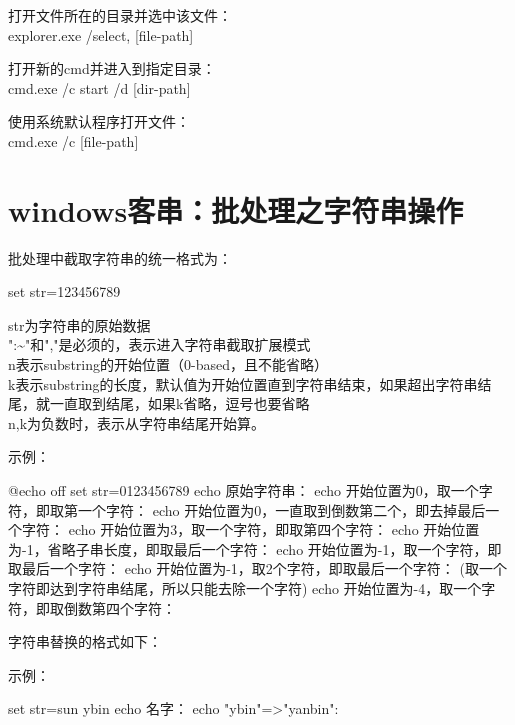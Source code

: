 ﻿\documentclass[a4paper,11pt]{article}
\begin{document}
  打开文件所在的目录并选中该文件：\\
  explorer.exe /select, [file-path]

  打开新的cmd并进入到指定目录：\\
  cmd.exe /c start /d [dir-path]

  使用系统默认程序打开文件：\\
  cmd.exe /c [file-path]

  \section[Windows客串：批处理-字符串操作]{windows客串：批处理之字符串操作}
  批处理中截取字符串的统一格式为：

  \begin{bashcode}
    set str=123456789
  \end{bashcode}

  str为字符串的原始数据\\
  ":\~{}"和","是必须的，表示进入字符串截取扩展模式\\
  n表示substring的开始位置（0-based，且不能省略）\\
  k表示substring的长度，默认值为开始位置直到字符串结束，如果超出字符串结尾，就一直取到结尾，如果k省略，逗号也要省略\\
  n,k为负数时，表示从字符串结尾开始算。


  示例：\par
  \begin{bashcode}
    @echo off
    set str=0123456789
    echo 原始字符串：%
    echo 开始位置为0，取一个字符，即取第一个字符：%
    echo 开始位置为0，一直取到倒数第二个，即去掉最后一个字符：%
    echo 开始位置为3，取一个字符，即取第四个字符：%
    echo 开始位置为-1，省略子串长度，即取最后一个字符：%
    echo 开始位置为-1，取一个字符，即取最后一个字符：%
    echo 开始位置为-1，取2个字符，即取最后一个字符：%
    (取一个字符即达到字符串结尾，所以只能去除一个字符)
    echo 开始位置为-4，取一个字符，即取倒数第四个字符：%
  \end{bashcode}


  字符串替换的格式如下：

  \begin{bashcode}
  \end{bashcode}

  示例：

  \begin{bashcode}
    set str=sun ybin
    echo 名字：%
    echo "ybin"=>"yanbin": %
  \end{bashcode}
  
\end{document}
